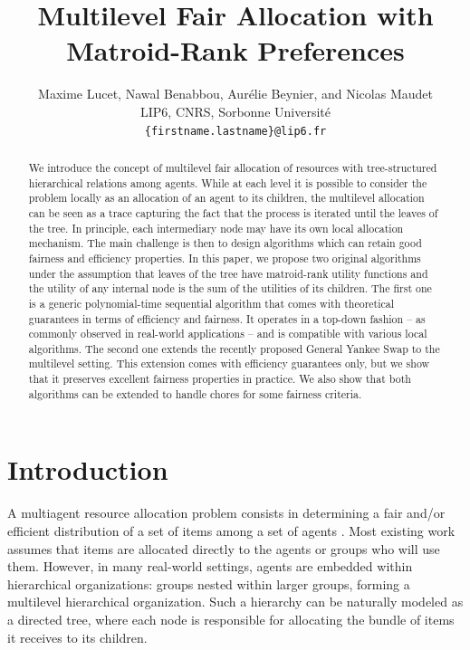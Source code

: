 \documentclass[]{article}
\date{}
\begin{document}
\title{\bfseries Multilevel Fair Allocation with Matroid-Rank Preferences}


\author{
Maxime Lucet, Nawal Benabbou, Aur\'elie Beynier, and Nicolas Maudet 
\\
LIP6, CNRS, Sorbonne Université\\
\texttt{\{firstname.lastname\}@lip6.fr}
}

\maketitle
\begin{abstract}
    We introduce the concept of multilevel fair allocation of resources with tree-structured hierarchical relations among agents.
    While at each level it is possible to consider the problem locally as an allocation of an agent to its children, the multilevel allocation can be seen as a trace capturing the fact that the process is iterated until the leaves of the tree. In principle, each intermediary node may have its own local allocation mechanism.
    The main challenge is then to design algorithms which can retain good fairness and efficiency properties.
    In this paper, we propose two original algorithms under the assumption that leaves of the tree have matroid-rank utility functions and the utility of any internal node is the sum of the utilities of its children. The first one is a generic polynomial-time sequential algorithm that comes with theoretical guarantees in terms of efficiency and fairness. It operates in a top-down fashion -- as commonly observed in real-world applications -- and is compatible with various local algorithms. The second one extends the recently proposed General Yankee Swap to the multilevel setting. This extension comes with efficiency guarantees only, but we show that it preserves excellent fairness properties in practice.
    We also show that both algorithms can be extended to handle chores for some fairness criteria. 
\end{abstract}

\section{Introduction}

A multiagent resource allocation problem consists in determining a fair and/or efficient distribution of a set of items among a set of agents \cite{Brandt2016}. Most existing work assumes that items are allocated directly to the agents or groups who will use them. However, in many real-world settings, agents are embedded within hierarchical organizations: groups nested within larger groups, forming a multilevel hierarchical organization. Such a hierarchy can be naturally modeled as a directed tree, where each node is responsible for allocating the bundle of items it receives to its children.
\end{document}
